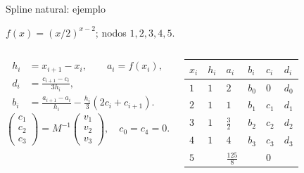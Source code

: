 \documentclass[main.tex]{subfiles}
\begin{document}
\begin{frame}[t]{Spline natural: ejemplo}
\par\noindent\begin{minipage}[t][9mm][t]{\textwidth}\small\strut $f(x)=(x/2)^{x-2}$; nodos $1,2,3,4,5$.\end{minipage}\par\nointerlineskip
\begin{columns}[T]\scriptsize\begin{align*}
h_i&=x_{i+1}-x_i,\qquad a_i=f(x_i),\\
d_i&=\frac{c_{i+1}-c_i}{3h_i},\\
b_i&=\frac{a_{i+1}-a_i}{h_i}-\frac{h_i}{3}(2c_i+c_{i+1}).
\end{align*}\scriptsize\[\begin{pmatrix}c_1\\c_2\\c_3\end{pmatrix}=M^{-1}\begin{pmatrix}v_1\\v_2\\v_3\end{pmatrix},\quad c_0=c_4=0.\]\begin{minipage}[t]{\textwidth}\begingroup\scriptsize\setlength{\tabcolsep}{2pt}\begin{center}\begin{tabular}{|C{.12\textwidth}|C{.12\textwidth}|C{.12\textwidth}|C{.12\textwidth}|C{.12\textwidth}|C{.12\textwidth}|}\hline
\rule[-2mm]{0pt}{6mm}$x_i$&$h_i$&$a_i$&$b_i$&$c_i$&$d_i$\\\hline
\rule[-2.5mm]{0pt}{7mm}$1$&$1$&$2$&$b_0$&$0$&$d_0$\\\hline
\rule[-2.5mm]{0pt}{7mm}$2$&$1$&$1$&$b_1$&$c_1$&$d_1$\\\hline
\rule[-2.5mm]{0pt}{7mm}$3$&$1$&$\frac{3}{2}$&$b_2$&$c_2$&$d_2$\\\hline
\rule[-2.5mm]{0pt}{7mm}$4$&$1$&$4$&$b_3$&$c_3$&$d_3$\\\hline
\rule[-2.5mm]{0pt}{7mm}$5$&&$\frac{125}{8}$&&$0$&\\\hline
\end{tabular}\end{center}\endgroup\end{minipage}\par
\end{columns}
\end{frame}
\end{document}
